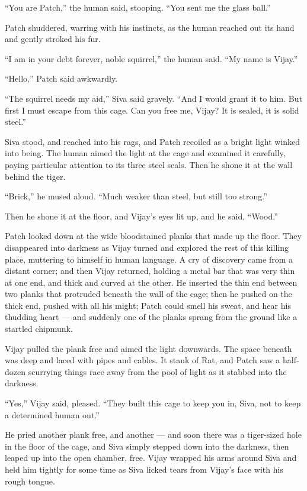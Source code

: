 \documentclass[ebook,oneside,openany,12pt]{memoir}
\begin{document}
“You are Patch,” the human said, stooping. “You sent me the glass
ball.”

Patch shuddered, warring with his instincts, as the human reached out
its hand and gently stroked his fur.

“I am in your debt forever, noble squirrel,” the human said. “My name
is Vijay.”

“Hello,” Patch said awkwardly.

“The squirrel needs my aid,” Siva said gravely. “And I would grant it
to him. But first I must escape from this cage. Can you free me,
Vijay? It is sealed, it is solid steel.”

Siva stood, and reached into his rags, and Patch recoiled as a bright
light winked into being. The human aimed the light at the cage and
examined it carefully, paying particular attention to its three steel
seals. Then he shone it at the wall behind the tiger.

“Brick,” he mused aloud. “Much weaker than steel, but still too
strong.”

Then he shone it at the floor, and Vijay’s eyes lit up, and he said,
“Wood.”

Patch looked down at the wide bloodstained planks that made up the
floor. They disappeared into darkness as Vijay turned and explored the
rest of this killing place, muttering to himself in human language. A
cry of discovery came from a distant corner; and then Vijay returned,
holding a metal bar that was very thin at one end, and thick and
curved at the other. He inserted the thin end between two planks that
protruded beneath the wall of the cage; then he pushed on the thick
end, pushed with all his might; Patch could smell his sweat, and hear
his thudding heart — and suddenly one of the planks sprang from the
ground like a startled chipmunk.

Vijay pulled the plank free and aimed the light downwards. The space
beneath was deep and laced with pipes and cables. It stank of Rat, and
Patch saw a half-dozen scurrying things race away from the pool of
light as it stabbed into the darkness.

“Yes,” Vijay said, pleased. “They built this cage to keep you in,
Siva, not to keep a determined human out.”

He pried another plank free, and another — and soon there was a
tiger-sized hole in the floor of the cage, and Siva simply stepped
down into the darkness, then leaped up into the open chamber,
free. Vijay wrapped his arms around Siva and held him tightly for some
time as Siva licked tears from Vijay’s face with his rough tongue.
\end{document}
